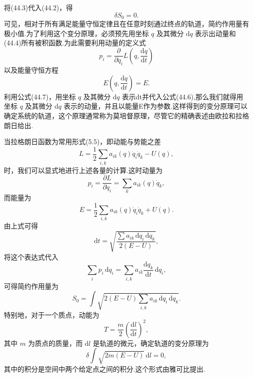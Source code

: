 将(44.3)代入(44.2)，得
\begin{equation}
  \delta S_0=0.
\end{equation}
可见，相对于所有满足能量守恒定律且在任意时刻通过终点的轨道，简约作用量有极小值.为了利用这个变分原理，必须预先用坐标
$q$ 及其微分 $\mathrm{d}q$
表示出动量和(44.4)所有被积函数.为此需要利用动量的定义式
\begin{equation}
  p_i=\frac{\partial}{\partial\dot{q}_i}
  L\left(q,\frac{\mathrm{d}q}{\mathrm{d}t}\right)
\end{equation}
以及能量守恒方程
\begin{equation}
  E\left(q,\frac{\mathrm{d}q}{\mathrm{d}t}\right)=E.
\end{equation}
利用公式(44.7)，用坐标 $q$ 及其微分
$\mathrm{d}q$ 表示dt并代入公式(44.6),那么我们就得用坐标 $q$ 及其微分
$\mathrm{d}q$
表示的动量，并且以能量E作为参数.这样得到的变分原理可以确定系统的轨道，这个原理通常称为莫培督原理，尽管它的精确表述由欧拉和拉格朗日给出.

当拉格朗日函数为常用形式(5.5)，即动能与势能之差
\begin{equation*}
  L=\frac{1}{2}\sum_{i,k}a_{ik}(q)\dot{q}_i\dot{q}_k-U(q),
\end{equation*}
时，我们可以显式地进行上述各量的计算.这时动量为
\begin{equation*}
  p_i=\frac{\partial L}{\partial\dot{q}_i}=\sum_k a_{ik}(q)\dot{q}_k,
\end{equation*}
而能量为
\begin{equation*}
  E=\frac{1}{2}\sum_{i,k}a_{ik}(q)\dot{q}_i\dot{q}_k+U(q).
\end{equation*}
由上式可得
\begin{equation}
  \mathrm{d}t=\sqrt{\frac{\sum a_{ik}\,\mathrm{d}q_i\,\mathrm{d}q_k}{2(E-U)}},
\end{equation}
将这个表达式代入
\begin{equation*}
  \sum_i p_i\,\mathrm{d}q_i
  =\sum_{i,k}a_{ik}\frac{\mathrm{d}q_k}{\mathrm{d}t}\,\mathrm{d}q_i,
\end{equation*}
可得简约作用量为
\begin{equation}
  S_0=\int\sqrt{2(E-U)\sum_{i,k}a_{ik}\,\mathrm{d}q_i\,\mathrm{d}q_k}.
\end{equation}
特别地，对于一个质点，动能为
\begin{equation*}
  T=\frac{m}{2}\left(\frac{\mathrm{d}l}{\mathrm{d}t}\right)^2,
\end{equation*}
其中 $m$ 为质点的质量，而 $\mathrm{d}l$
是轨道的微元，确定轨道的变分原理为
\begin{equation}
  \delta\int\sqrt{2m(E-U)}\,\mathrm{d}l=0,
\end{equation}
其中的积分是空间中两个给定点之间的积分.这个形式由雅可比提出.

